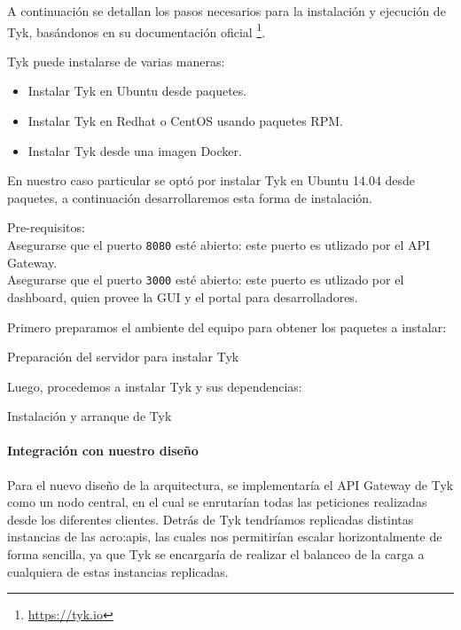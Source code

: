 A continuación se detallan los pasos necesarios para la instalación y ejecución de Tyk, basándonos en su documentación oficial \footnote{\url{https://tyk.io}}.

Tyk puede instalarse de varias maneras:

\begin{itemize}
  \item Instalar Tyk en Ubuntu desde paquetes.
  \item Instalar Tyk en Redhat o CentOS usando paquetes RPM.
  \item Instalar Tyk desde una imagen Docker.
\end{itemize}

En nuestro caso particular se optó por instalar Tyk en Ubuntu 14.04 desde paquetes, a continuación desarrollaremos esta forma de instalación.

Pre-requisitos:\\
Asegurarse que el puerto \texttt{8080} esté abierto: este puerto es utlizado por el API Gateway.\\
Asegurarse que el puerto \texttt{3000} esté abierto: este puerto es utlizado por el dashboard, quien provee la GUI y el portal para desarrolladores.

Primero preparamos el ambiente del equipo para obtener los paquetes a instalar:

\begin{listing}[H]
  \caption{Preparación del servidor para instalar Tyk}
  \label{soa:tecnologias:tyk:bash-preparacion}
\end{listing}

Luego, procedemos a instalar Tyk y sus dependencias:

\begin{listing}[H]
  \caption{Instalación y arranque de Tyk}
  \label{soa:tecnologias:tyk:bash-instalacion}
\end{listing}


\paragraph{Integración con nuestro diseño}

Para el nuevo diseño de la arquitectura, se implementaría el API Gateway de Tyk como un nodo central, en el cual se enrutarían todas las peticiones realizadas desde los diferentes clientes.  Detrás de Tyk tendríamos replicadas distintas instancias de las \glspl{acro:api}, las cuales nos permitirían escalar horizontalmente de forma sencilla, ya que Tyk se encargaría de realizar el balanceo de la carga a cualquiera de estas instancias replicadas.

